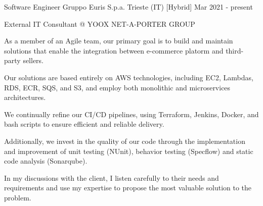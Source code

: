 

\begin{cventries}

  \cventry
    {Software Engineer} %
    {Gruppo Euris S.p.a.} %
    {Trieste (IT) [Hybrid]} %
    {Mar 2021 - present } %
    {
      \begin{cvitems} %
        \item {External IT Consultant @ YOOX NET-A-PORTER GROUP}
        \item {As a member of an Agile team, our primary goal is to build and maintain solutions that
        enable the integration between e-commerce platorm and third-party sellers.}
        \item {Our solutions are based entirely on AWS technologies, including EC2, Lambdas, RDS, ECR,
        SQS, and S3, and employ both monolithic and microservices architectures.}
        \item {We continually refine our CI/CD pipelines, using Terraform, Jenkins, Docker, and bash
        scripts to ensure efficient and reliable delivery.}
        \item {Additionally, we invest in the quality of our code through the implementation and
        improvement of unit testing (NUnit), behavior testing (Specflow) and static code analysis
        (Sonarqube).}
        \item {In my discussions with the client, I listen carefully to their needs and requirements and
        use my expertise to propose the most valuable solution to the problem.}
      \end{cvitems}
    }
    

\end{cventries}
